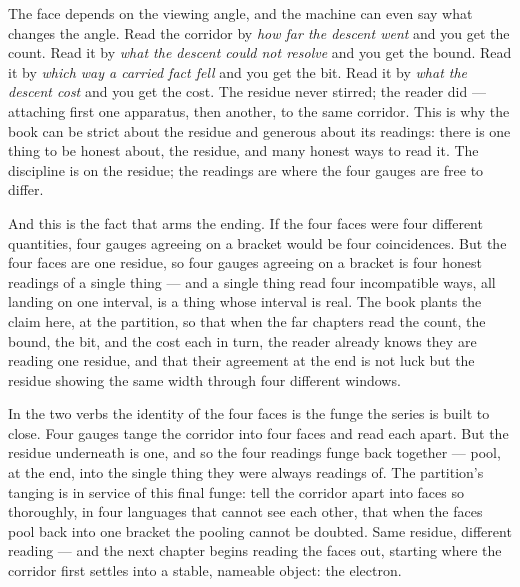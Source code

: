 The face depends on the viewing angle, and the machine can even say what changes the angle. Read the corridor by
\emph{how far the descent went} and you get the count. Read it by \emph{what the descent could not resolve} and you get
the bound. Read it by \emph{which way a carried fact fell} and you get the bit. Read it by \emph{what the descent cost}
and you get the cost. The residue never stirred; the reader did --- attaching first one apparatus, then another, to the
same corridor. This is why the book can be strict about the residue and generous about its readings: there is one thing
to be honest about, the residue, and many honest ways to read it. The discipline is on the residue; the readings are
where the four gauges are free to differ.

And this is the fact that arms the ending. If the four faces were four different quantities, four gauges agreeing on a
bracket would be four coincidences. But the four faces are one residue, so four gauges agreeing on a bracket is four
honest readings of a single thing --- and a single thing read four incompatible ways, all landing on one interval, is a
thing whose interval is real. The book plants the claim here, at the partition, so that when the far chapters read the
count, the bound, the bit, and the cost each in turn, the reader already knows they are reading one residue, and that
their agreement at the end is not luck but the residue showing the same width through four different windows.

In the two verbs the identity of the four faces is the funge the series is built to close. Four gauges tange the corridor
into four faces and read each apart. But the residue underneath is one, and so the four readings funge back together ---
pool, at the end, into the single thing they were always readings of. The partition's tanging is in service of this final
funge: tell the corridor apart into faces so thoroughly, in four languages that cannot see each other, that when the
faces pool back into one bracket the pooling cannot be doubted. Same residue, different reading --- and the next chapter
begins reading the faces out, starting where the corridor first settles into a stable, nameable object: the electron.
